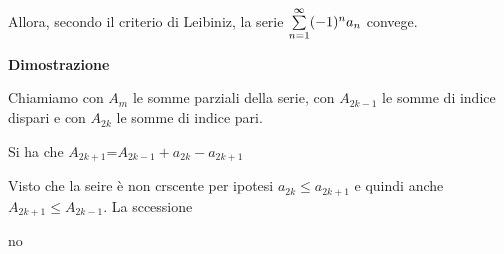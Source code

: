 Allora, secondo il criterio di Leibiniz, la serie $\sum\limits_{n=1}^{\infty}(-1)^n a_n$ convege.

\textbf{Dimostrazione}

Chiamiamo con $A_m$ le somme parziali della serie, con $A_{2k-1}$ le somme di indice dispari e con $A_{2k}$ le somme di indice pari.

Si ha che $A_{2k+1}$=$A_{2k-1}+a_{2k}-a_{2k+1}$

Visto che la seire è non crscente per ipotesi $a_{2k} \leq a_{2k+1}$ e quindi anche $A_{2k+1} \leq A_{2k-1}$. La 
sccessione


no


